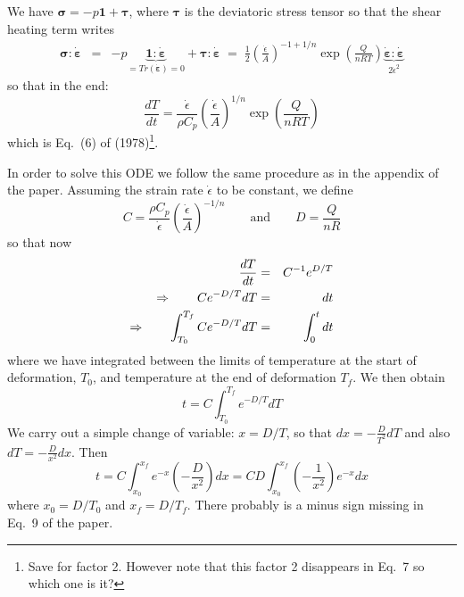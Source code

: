 We have ${\bm \sigma} = - p {\bm 1} + {\bm \tau}$, where ${\bm \tau}$ is the 
deviatoric stress tensor so that the shear heating term writes
\begin{eqnarray}
{\bm \sigma}:\dot{\bm \varepsilon} 
&=& - p \underbrace{{\bm 1}:\dot{\bm \varepsilon}}_{= Tr({\bm \dot\varepsilon})=0} + {\bm \tau}:\dot{\bm \varepsilon} 
\; = \; \frac12 \left(\frac{\dot\epsilon}{A} \right)^{-1+1/n}
\exp \left(\frac{Q}{nRT} \right) \underbrace{\dot{\bm \varepsilon}: \dot{\bm \varepsilon}}_{2 \dot\epsilon^2}
\end{eqnarray}
so that in the end:
\[
\boxed{
\frac{dT}{dt} = \frac{\dot\epsilon}{\rho C_p}  \left(\frac{\dot\epsilon}{A} \right)^{1/n}
\exp \left(\frac{Q}{nRT} \right)
}
\]
which is Eq.~(6) of \textcite{stuw98} (1978)\footnote{Save for factor 2. However note that this factor 2 
disappears in Eq.~7 so which one is it?}.

In order to solve this ODE we follow the same procedure as in the appendix of the paper. 
Assuming the strain rate $\dot\epsilon$ to be constant, we define 
\[
C = \frac{\rho C_p}{ \dot\epsilon} \left(\frac{\dot\epsilon}{A} \right)^{-1/n}
\qquad
\text{and}
\qquad
D = \frac{Q}{nR}
\]
so that now
\begin{eqnarray}
\frac{dT}{dt} &=& C^{-1} e^{D/T} \nonumber\\
\Rightarrow \qquad C e^{-D/T}  dT &=&  dt \nonumber\\
\Rightarrow \qquad \int_{T_0}^{T_f} C e^{-D/T}  dT &=&  \int_0^t dt 
\end{eqnarray}
where we have integrated between the limits of temperature at the start of
deformation, $T_0$, and temperature at the end of deformation $T_f$.
We then obtain 
\[
t = C \int_{T_0}^{T_f} e^{-D/T}  dT
\]
We carry out a simple change of variable: $x=D/T$, so that $dx = -\frac{D}{T^2} dT$ 
and also $dT=-\frac{D}{x^2} dx$. Then 
\[
t = C \int_{x_0}^{x_f} e^{-x} \left(-\frac{D}{x^2} \right) dx 
= CD \int_{x_0}^{x_f} \left(-\frac{1}{x^2} \right) e^{-x} dx
\]
where $x_0=D/T_0$ and $x_f=D/T_f$. There probably is a minus sign missing in Eq.~9 of the paper.

